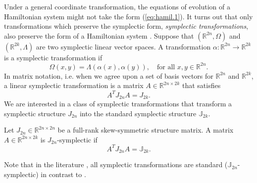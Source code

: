 Under a general coordinate transformation, the equations of evolution of a Hamiltonian system might not take the form (\ref{eq:hamil.1}). It turns out that only transformations which preserve the symplectic form, \emph{symplectic transformations}, also preserve the form of a Hamiltonian system \cite{Hairer:1250576}. Suppose that $(\mathbb R^{2n},\Omega)$ and $(\mathbb R^{2k},\Lambda)$ are two symplectic linear vector spaces. A transformation $\alpha:\mathbb R^{2n}\to\mathbb R^{2k}$ is a symplectic transformation if
\begin{equation} \label{eq:hamil.3}
	\Omega(x,y) = \Lambda(\alpha(x),\alpha(y)), \quad \text{for all } x,y\in\mathbb R^{2n}.
\end{equation}
In matrix notation, i.e. when we agree upon a set of basis vectors for $\mathbb R^{2n}$ and $\mathbb R^{2k}$, a linear symplectic transformation is a matrix $A\in \mathbb R^{2n\times 2k}$ that satisfies
\begin{equation} \label{eq:hamil.4}
	A^T J_{2n} A = J_{2k}.
\end{equation}
We are interested in a class of symplectic transformations that transform a symplectic structure $J_{2n}$ into the standard symplectic structure $\mathbb J_{2k}$.
\begin{definition} \label{def:symp-mat}
Let $J_{2n}\in \mathbb R^{2n\times 2n}$ be a full-rank skew-symmetric structure matrix. A matrix $A\in\mathbb R^{2n\times 2k}$ is $J_{2n}$-symplectic if
\begin{equation} \label{eq:hamil.5}
A^T J_{2n} A = \mathbb{J}_{2k}.
\end{equation}
\end{definition}
Note that in the literature \cite{Marsden:2010:IMS:1965128,Hairer:1250576}, all symplectic transformations are standard ($\mathbb{J}_{2n}$-symplectic) in contrast to .

